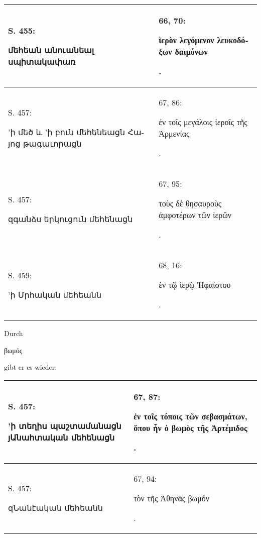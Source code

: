 \documentclass{article}
\begin{document}
{\begin{table}[H]
\begin{tabular}{p{45mm}|p{45mm}}
        S. 455: \begin{armenian}մեհեան անուանեալ սպիտակափառ\end{armenian} & 66, 70: \begin{greek}ἱερὸν λεγόμενον λευκοδόξων δαιμόνων\end{greek}.   \\ \hline
        S. 457: \begin{armenian}'ի մեծ և 'ի բուն մեհենեացն Հայոց թագաւորացն\end{armenian} & 67, 86: \begin{greek}ἐν τοῖς μεγάλοις ἱεροῖς τῆς Ἀρμενίας\end{greek}.   \\ \hline
        S. 457: \begin{armenian}զգանձս երկուցուն մեհենացն\end{armenian} & 67, 95: \begin{greek}τοὺς δὲ θησαυροὺς ἀμφοτέρων τῶν ἱερῶν\end{greek}.   \\ \hline
        S. 459: \begin{armenian}'ի Մրհական մեհեանն\end{armenian} & 68, 16: \begin{greek}ἑν τῷ ἱερῷ Ἡφαίστου\end{greek}. \\ \hline
    \end{tabular}
\end{table}
\hspace*{5mm}Durch \begin{greek}βωμός\end{greek} gibt er es wieder:  
\begin{table}[H]
    \centering
    \footnotesize
    \begin{tabular}{p{45mm}|p{45mm}}
    \hline
        S. 457: \begin{armenian}'ի տեղիս պաշտամանացն յԱնահտական մեհենացն\end{armenian} & 67, 87: \begin{greek}ἐν τοῖς τόποις τῶν σεβασμάτων, ὅπου ἦν ὁ βωμὸς τῆς Ἀρτέμιδος\end{greek}.   \\ \hline
        S. 457: \begin{armenian}զՆանէական մեհեանն\end{armenian} & 67, 94: \begin{greek}τὸν τῆς Ἀθηνᾶς βωμόν\end{greek}.   \\ \hline

\end{tabular}
\end{table}}
\end{document}
